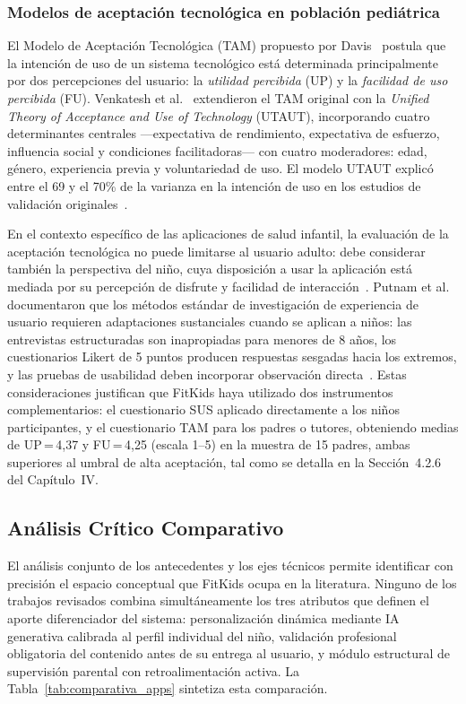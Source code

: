 			\subsubsection{Modelos de aceptación tecnológica en población pediátrica}
				El Modelo de Aceptación Tecnológica (TAM) propuesto por Davis~\cite{Davis1989} postula que la intención de uso de un sistema tecnológico está determinada principalmente por dos percepciones del usuario: la \textit{utilidad percibida} (UP) y la \textit{facilidad de uso percibida} (FU). Venkatesh et al.~\cite{Venkatesh2003} extendieron el TAM original con la \textit{Unified Theory of Acceptance and Use of Technology} (UTAUT), incorporando cuatro determinantes centrales ---expectativa de rendimiento, expectativa de esfuerzo, influencia social y condiciones facilitadoras--- con cuatro moderadores: edad, género, experiencia previa y voluntariedad de uso. El modelo UTAUT explicó entre el 69 y el 70\% de la varianza en la intención de uso en los estudios de validación originales~\cite{Venkatesh2003}.
				
				En el contexto específico de las aplicaciones de salud infantil, la evaluación de la aceptación tecnológica no puede limitarse al usuario adulto: debe considerar también la perspectiva del niño, cuya disposición a usar la aplicación está mediada por su percepción de disfrute y facilidad de interacción~\cite{Hourcade2015}. Putnam et al.~\cite{Putnam2020} documentaron que los métodos estándar de investigación de experiencia de usuario requieren adaptaciones sustanciales cuando se aplican a niños: las entrevistas estructuradas son inapropiadas para menores de 8 años, los cuestionarios Likert de 5 puntos producen respuestas sesgadas hacia los extremos, y las pruebas de usabilidad deben incorporar observación directa~\cite{Putnam2020}. Estas consideraciones justifican que FitKids haya utilizado dos instrumentos complementarios: el cuestionario SUS aplicado directamente a los niños participantes, y el cuestionario TAM para los padres o tutores, obteniendo medias de UP\,=\,4,37 y FU\,=\,4,25 (escala 1--5) en la muestra de 15 padres, ambas superiores al umbral de alta aceptación, tal como se detalla en la Sección~4.2.6 del Capítulo~IV.
			
		\subsection{Análisis Crítico Comparativo}
			El análisis conjunto de los antecedentes y los ejes técnicos permite identificar con precisión el espacio conceptual que FitKids ocupa en la literatura. Ninguno de los trabajos revisados combina simultáneamente los tres atributos que definen el aporte diferenciador del sistema: personalización dinámica mediante IA generativa calibrada al perfil individual del niño, validación profesional obligatoria del contenido antes de su entrega al usuario, y módulo estructural de supervisión parental con retroalimentación activa. La Tabla~\ref{tab:comparativa_apps} sintetiza esta comparación.
			
